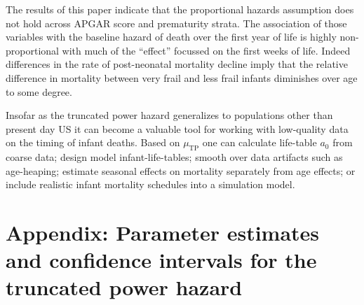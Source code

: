 \documentclass[smallextended]{svjour3} %
\begin{document}
The results of this paper indicate that the proportional hazards
assumption does not hold across APGAR score and prematurity strata. The
association of those variables with the baseline hazard of death over
the first year of life is highly non-proportional with much of the
``effect'' focussed on the first weeks of life. Indeed differences in
the rate of post-neonatal mortality decline imply that the relative
difference in mortality between very frail and less frail infants
diminishes over age to some degree.

Insofar as the truncated power hazard generalizes to populations other
than present day US it can become a valuable tool for working with
low-quality data on the timing of infant deaths. Based on
\(\mu_\text{TP}\) one can calculate life-table \(a_0\) from coarse data;
design model infant-life-tables; smooth over data artifacts such as
age-heaping; estimate seasonal effects on mortality separately from age
effects; or include realistic infant mortality schedules into a
simulation model.

\clearpage

\section*{Appendix: Parameter estimates and confidence intervals for the
truncated power
hazard}\label{appendix-parameter-estimates-and-confidence-intervals-for-the-truncated-power-hazard}
\end{document}
